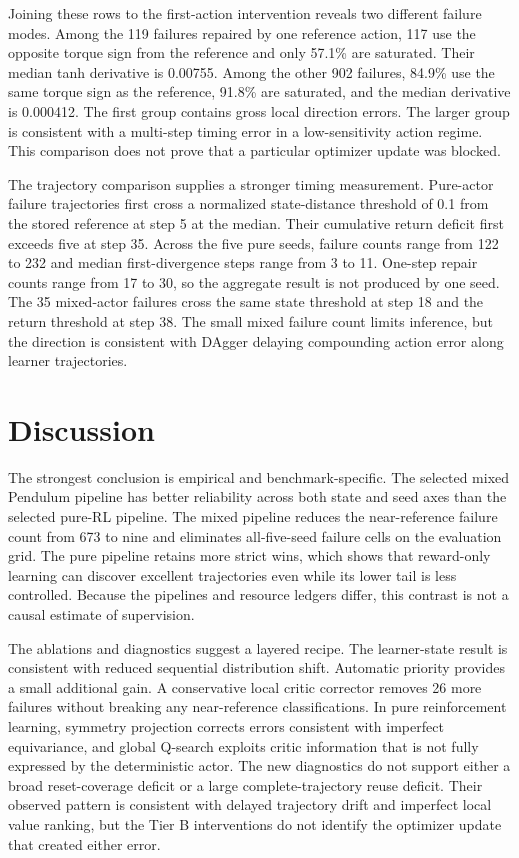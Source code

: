 \documentclass[10pt,twocolumn]{article}
\begin{document}
Joining these rows to the first-action intervention reveals two different failure modes. Among the 119 failures repaired by one reference action, 117 use the opposite torque sign from the reference and only 57.1\% are saturated. Their median tanh derivative is 0.00755. Among the other 902 failures, 84.9\% use the same torque sign as the reference, 91.8\% are saturated, and the median derivative is 0.000412. The first group contains gross local direction errors. The larger group is consistent with a multi-step timing error in a low-sensitivity action regime. This comparison does not prove that a particular optimizer update was blocked.

The trajectory comparison supplies a stronger timing measurement. Pure-actor failure trajectories first cross a normalized state-distance threshold of 0.1 from the stored reference at step 5 at the median. Their cumulative return deficit first exceeds five at step 35. Across the five pure seeds, failure counts range from 122 to 232 and median first-divergence steps range from 3 to 11. One-step repair counts range from 17 to 30, so the aggregate result is not produced by one seed. The 35 mixed-actor failures cross the same state threshold at step 18 and the return threshold at step 38. The small mixed failure count limits inference, but the direction is consistent with DAgger delaying compounding action error along learner trajectories.

\section{Discussion}

The strongest conclusion is empirical and benchmark-specific. The selected mixed Pendulum pipeline has better reliability across both state and seed axes than the selected pure-RL pipeline. The mixed pipeline reduces the near-reference failure count from 673 to nine and eliminates all-five-seed failure cells on the evaluation grid. The pure pipeline retains more strict wins, which shows that reward-only learning can discover excellent trajectories even while its lower tail is less controlled. Because the pipelines and resource ledgers differ, this contrast is not a causal estimate of supervision.

The ablations and diagnostics suggest a layered recipe. The learner-state result is consistent with reduced sequential distribution shift. Automatic priority provides a small additional gain. A conservative local critic corrector removes 26 more failures without breaking any near-reference classifications. In pure reinforcement learning, symmetry projection corrects errors consistent with imperfect equivariance, and global Q-search exploits critic information that is not fully expressed by the deterministic actor. The new diagnostics do not support either a broad reset-coverage deficit or a large complete-trajectory reuse deficit. Their observed pattern is consistent with delayed trajectory drift and imperfect local value ranking, but the Tier B interventions do not identify the optimizer update that created either error.
\end{document}
